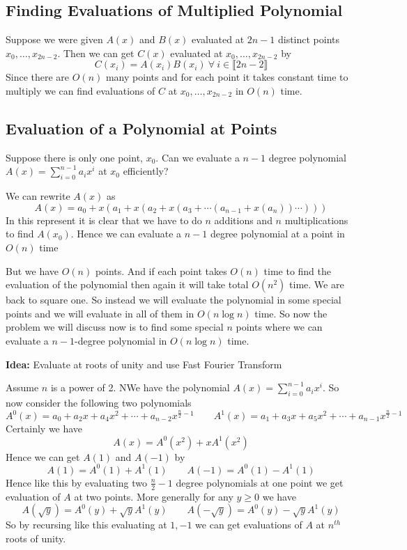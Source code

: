 \subsection{Finding Evaluations of Multiplied Polynomial}

Suppose we were given $A(x)$ and $B(x)$ evaluated at $2n-1$ distinct points $x_0,\dots, x_{2n-2}$. Then we can get $C(x)$ evaluated at $x_0,\dots, x_{2n-2}$ by $$C(x_i)=A(x_i)B(x_i)\ \forall\ i\in \llbracket 2n-2\rrbracket$$Since there are $O(n)$ many points and for each point it takes constant time to multiply we can find evaluations of $C$ at $x_0,\dots, x_{2n-2}$ in $ O(n)$ time.
\subsection{Evaluation of a Polynomial at Points}\label{fft}
\begin{question}{}{}
	Suppose there is only one point, $x_0$. Can we evaluate a $n-1$ degree polynomial $A(x)=\sum\limits_{i=0}^{n-1}a_ix^i$ at $x_0$ efficiently?
\end{question}
We can rewrite $A(x)$ as $$A(x)=a_0+x(a_1+x(a_2+x(a_3+\cdots (a_{n-1}+x(a_n))\cdots )))$$In this represent it is clear that we have to do $n$ additions and $n$ multiplications to find $A(x_0)$. Hence we can evaluate a $n-1$ degree polynomial at a point in $O(n)$ time


But we have $O(n)$ points. And if each point takes $O(n)$ time to find the evaluation of the polynomial then again it will take total $O(n^2)$ time. We are back to square one. So instead we will evaluate the polynomial in some special points and we will evaluate in all of them in $O(n\log n)$ time. So now the problem we will discuss now is to find some special $n$ points where we can evaluate a $n-1$-degree polynomial in $O(n\log n)$ time.
\parinf

\textbf{Idea:} Evaluate at roots of unity and use Fast Fourier Transform
\parinn

Assume $n$ is a power of 2. NWe have the polynomial $A(x)=\sum\limits_{i=0}^{n-1}a_ix^i$. So now consider the following two polynomials $$A^0(x)=a_0+a_2x+a_4x^2+\cdots+a_{n-2}x^{\frac{n}2-1}\qquad A^1(x)=a_1+a_3x+a_5x^2+\cdots+a_{n-1}x^{\frac{n}2-1}$$Certainly we have $$A(x)=A^0(x^2)+xA^1(x^2)$$Hence we can get $A(1)$ and $A(-1)$ by $$A(1)=A^0(1)+A^1(1)\qquad A(-1)=A^0(1)-A^1(1)$$Hence like this by evaluating two $\frac{n}2-1$ degree polynomials at one point we get evaluation of $A$ at two points. More generally for any $y\geq 0$ we have$$A(\sqrt{y})=A^0(y)+\sqrt{y}A^1(y)\qquad A(-\sqrt{y})=A^0(y)-\sqrt{y}A^1(y)$$So by recursing like this evaluating at $1,-1$ we can get evaluations of $A$ at $n^{th}$ roots of unity.

